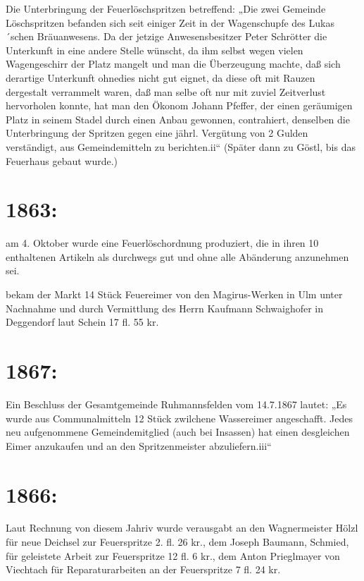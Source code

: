 \documentclass[12pt,a4paper]{book}
\begin{document}
Die Unterbringung der Feuerlöschspritzen betreffend: „Die zwei Gemeinde
Löschspritzen befanden sich seit einiger Zeit in der Wagenschupfe des
Lukas´schen Bräuanwesens. Da der jetzige Anwesensbesitzer Peter Schrötter die
Unterkunft in eine andere Stelle wünscht, da ihm selbst wegen vielen
Wagengeschirr der Platz mangelt und man die Überzeugung machte, daß sich
derartige Unterkunft ohnedies nicht gut eignet, da diese oft mit Rauzen
dergestalt verrammelt waren, daß man selbe oft nur mit zuviel Zeitverlust
hervorholen konnte, hat man den Ökonom Johann Pfeffer, der einen geräumigen
Platz in seinem Stadel durch einen Anbau gewonnen, contrahiert, denselben die
Unterbringung der Spritzen gegen eine jährl. Vergütung von 2 Gulden verständigt,
aus Gemeindemitteln zu berichten.ii“ (Später dann zu Göstl, bis das Feuerhaus
gebaut wurde.)

\section{1863:}

am 4. Oktober wurde eine Feuerlöschordnung produziert, die in ihren 10
enthaltenen Artikeln als durchwegs gut und ohne alle Abänderung anzunehmen sei.

bekam der Markt 14 Stück Feuereimer von den Magirus-Werken in Ulm unter
Nachnahme und durch Vermittlung des Herrn Kaufmann Schwaighofer in Deggendorf
laut Schein 17 fl. 55 kr.

\section{1867:}

Ein Beschluss der Gesamtgemeinde Ruhmannsfelden vom 14.7.1867 lautet:
„Es wurde aus Communalmitteln 12 Stück zwilchene Wassereimer angeschafft. Jedes
neu aufgenommene Gemeindemitglied (auch bei Insassen) hat einen desgleichen
Eimer anzukaufen und an den Spritzenmeister abzuliefern.iii“

\section{1866:}

Laut Rechnung von diesem Jahriv wurde verausgabt an den Wagnermeister Hölzl für
neue Deichsel zur Feuerspritze 2. fl. 26 kr., dem Joseph Baumann, Schmied, für
geleistete Arbeit zur Feuerspritze 12 fl. 6 kr., dem Anton Prieglmayer von
Viechtach für Reparaturarbeiten an der Feuerspritze 7 fl. 24 kr.
\end{document}
